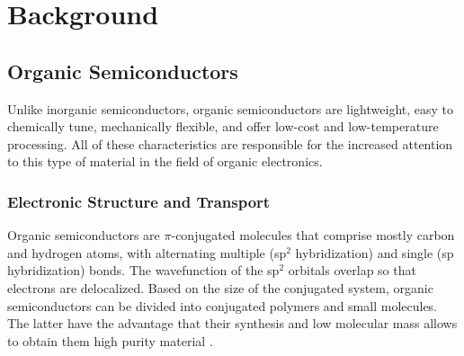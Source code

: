 \chapter{Background} \label{chap:background}

\section{Organic Semiconductors}

Unlike inorganic semiconductors, organic semiconductors are lightweight, easy to chemically tune, mechanically flexible, and offer low-cost and low-temperature processing. All of these characteristics are responsible for the increased attention to this type of material in the field of organic electronics. 


\subsection{Electronic Structure and Transport} 

Organic semiconductors are $\pi$-conjugated molecules that comprise mostly carbon and hydrogen atoms, with alternating multiple (sp$^{2}$ hybridization) and single (sp hybridization) bonds. The wavefunction of the sp$^{2}$ orbitals overlap so that electrons are delocalized.
Based on the size of the conjugated system, organic semiconductors can be divided into conjugated polymers and small molecules. The latter have the advantage that their synthesis and low molecular mass allows to obtain them high purity material \cite{alcacerElectronicStructureOrganic2018}.

